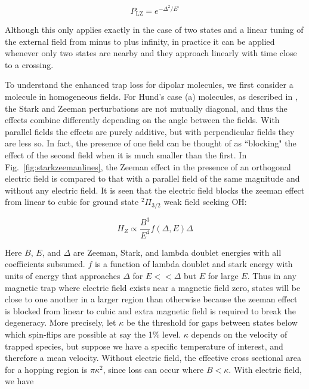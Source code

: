 \documentclass[%
 reprint,
 amsmath,amssymb,
 aps,
prl,
]{revtex4-1}
\begin{document}
\begin{equation}
P_{\text{LZ}}=e^{-\Delta^2/E'}
\end{equation}

Although this only applies exactly in the case of two states and a linear tuning of the external field from minus to plus infinity, in practice it can be applied whenever only two states are nearby and they approach linearly with time close to a crossing. 

To understand the enhanced trap loss for dipolar molecules, we first consider a molecule in homogeneous fields. For Hund's case (a) molecules, as described in \cite{Lara2008}, the Stark and Zeeman perturbations are not mutually diagonal, and thus the effects combine differently depending on the angle between the fields. With parallel fields the effects are purely additive, but with perpendicular fields they are less so. In fact, the presence of one field can be thought of as ``blocking" the effect of the second field when it is much smaller than the first. In Fig.~\ref{fig:starkzeemanlines}, the Zeeman effect in the presence of an orthogonal electric field is compared to that with a parallel field of the same magnitude and without any electric field. It is seen that the electric field blocks the zeeman effect from linear to cubic for ground state $^2\Pi_{3/2}$ weak field seeking OH:

\begin{equation}
H_Z\propto \frac{B^3}{E^4}f(\Delta,E)\Delta
\end{equation}

Here $B$, $E$, and $\Delta$ are Zeeman, Stark, and lambda doublet energies with all coefficients subsumed. $f$ is a function of lambda doublet and stark energy with units of energy that approaches $\Delta$ for $E << \Delta$ but $E$ for large $E$. Thus in any magnetic trap where electric field exists near a magnetic field zero, states will be close to one another in a larger region than otherwise because the zeeman effect is blocked from linear to cubic and extra magnetic field is required to break the degeneracy. More precisely, let $\kappa$ be the threshold for gaps between states below which spin-flips are possible at say the 1\% level. $\kappa$ depends on the velocity of trapped species, but suppose we have a specific temperature of interest, and therefore a mean velocity. Without electric field, the effective cross sectional area for a hopping region is $\pi \kappa^2$, since loss can occur where $B<\kappa$. With electric field, we have
\end{document}

